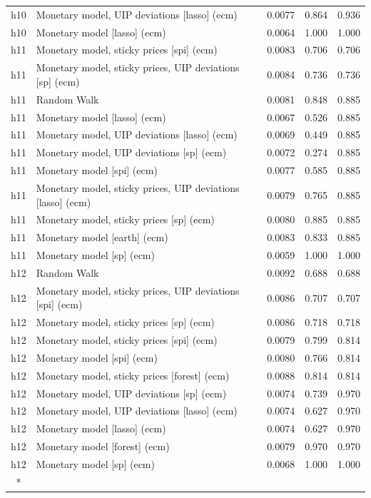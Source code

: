 \begin{ThreePartTable}
\begin{longtable}[t]{cp{5.5cm}ccc}
h10 & \raggedright Monetary model, UIP deviations [lasso] (ecm) & 0.0077 & 0.864 & 0.936\\
h10 & \raggedright Monetary model [lasso] (ecm) & 0.0064 & 1.000 & 1.000\\
\addlinespace
h11 & \raggedright Monetary model, sticky prices [spi] (ecm) & 0.0083 & 0.706 & 0.706\\
h11 & \raggedright Monetary model, sticky prices, UIP deviations [sp] (ecm) & 0.0084 & 0.736 & 0.736\\
h11 & \raggedright Random Walk & 0.0081 & 0.848 & 0.885\\
h11 & \raggedright Monetary model [lasso] (ecm) & 0.0067 & 0.526 & 0.885\\
h11 & \raggedright Monetary model, UIP deviations [lasso] (ecm) & 0.0069 & 0.449 & 0.885\\
h11 & \raggedright Monetary model, UIP deviations [sp] (ecm) & 0.0072 & 0.274 & 0.885\\
h11 & \raggedright Monetary model [spi] (ecm) & 0.0077 & 0.585 & 0.885\\
h11 & \raggedright Monetary model, sticky prices, UIP deviations [lasso] (ecm) & 0.0079 & 0.765 & 0.885\\
h11 & \raggedright Monetary model, sticky prices [sp] (ecm) & 0.0080 & 0.885 & 0.885\\
h11 & \raggedright Monetary model [earth] (ecm) & 0.0083 & 0.833 & 0.885\\
h11 & \raggedright Monetary model [sp] (ecm) & 0.0059 & 1.000 & 1.000\\
\addlinespace
h12 & \raggedright Random Walk & 0.0092 & 0.688 & 0.688\\
h12 & \raggedright Monetary model, sticky prices, UIP deviations [spi] (ecm) & 0.0086 & 0.707 & 0.707\\
h12 & \raggedright Monetary model, sticky prices [sp] (ecm) & 0.0086 & 0.718 & 0.718\\
h12 & \raggedright Monetary model, sticky prices [spi] (ecm) & 0.0079 & 0.799 & 0.814\\
h12 & \raggedright Monetary model [spi] (ecm) & 0.0080 & 0.766 & 0.814\\
h12 & \raggedright Monetary model, sticky prices [forest] (ecm) & 0.0088 & 0.814 & 0.814\\
h12 & \raggedright Monetary model, UIP deviations [sp] (ecm) & 0.0074 & 0.739 & 0.970\\
h12 & \raggedright Monetary model, UIP deviations [lasso] (ecm) & 0.0074 & 0.627 & 0.970\\
h12 & \raggedright Monetary model [lasso] (ecm) & 0.0074 & 0.627 & 0.970\\
h12 & \raggedright Monetary model [forest] (ecm) & 0.0079 & 0.970 & 0.970\\
h12 & \raggedright Monetary model [sp] (ecm) & 0.0068 & 1.000 & 1.000\\*
\end{longtable}
\end{ThreePartTable}
\endgroup{}
